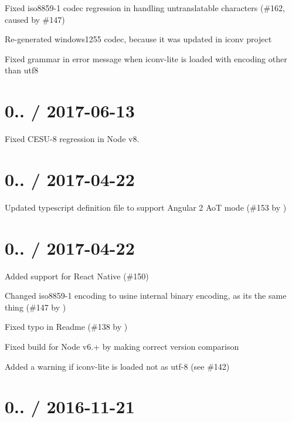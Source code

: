 \begin{DoxyItemize}
\item Fixed iso8859-\/1 codec regression in handling untranslatable characters (\#162, caused by \#147)
\item Re-\/generated windows1255 codec, because it was updated in iconv project
\item Fixed grammar in error message when iconv-\/lite is loaded with encoding other than utf8
\end{DoxyItemize}

\section*{0.. / 2017-\/06-\/13}


\begin{DoxyItemize}
\item Fixed C\+E\+S\+U-\/8 regression in Node v8.
\end{DoxyItemize}

\section*{0.. / 2017-\/04-\/22}


\begin{DoxyItemize}
\item Updated typescript definition file to support Angular 2 AoT mode (\#153 by )
\end{DoxyItemize}

\section*{0.. / 2017-\/04-\/22}


\begin{DoxyItemize}
\item Added support for React Native (\#150)
\item Changed iso8859-\/1 encoding to usine internal \textquotesingle{}binary\textquotesingle{} encoding, as it\textquotesingle{}s the same thing (\#147 by )
\item Fixed typo in Readme (\#138 by )
\item Fixed build for Node v6.+ by making correct version comparison
\item Added a warning if iconv-\/lite is loaded not as utf-\/8 (see \#142)
\end{DoxyItemize}

\section*{0.. / 2016-\/11-\/21}



